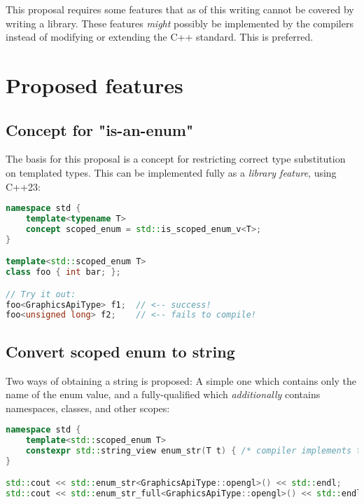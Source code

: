 \documentclass[
  format=manuscript,
  screen=true,
  review=false,
  nonacm=true,
  timestamp=true,
  balance=false]{acmart}
\begin{document}
This proposal requires some features that as of this writing cannot be covered by
writing a library. These features \textit{might} possibly be implemented by the
compilers instead of modifying or extending the C++ standard. This is preferred.


\section{Proposed features}

\subsection{Concept for "is-an-enum"}

The basis for this proposal is a concept for restricting correct type substitution
on templated types. This can be implemented fully as a \textit{library feature},
using C++23:\vspace{2mm}

\begin{lstlisting}[language=Cpp]
namespace std {
    template<typename T>
    concept scoped_enum = std::is_scoped_enum_v<T>;
}

template<std::scoped_enum T>
class foo { int bar; };

// Try it out:
foo<GraphicsApiType> f1;  // <-- success!
foo<unsigned long> f2;    // <-- fails to compile!
\end{lstlisting}


\subsection{Convert scoped enum to string}

Two ways of obtaining a string is proposed: A simple one which contains only the
name of the enum value, and a fully-qualified which \textit{additionally} contains
namespaces, classes, and other scopes:\vspace{2mm}

\begin{lstlisting}[language=Cpp]
namespace std {
    template<std::scoped_enum T>
    constexpr std::string_view enum_str(T t) { /* compiler implements this */ }
}

std::cout << std::enum_str<GraphicsApiType::opengl>() << std::endl;      // "opengl"
std::cout << std::enum_str_full<GraphicsApiType::opengl>() << std::endl; // "GraphicsApiType::opengl"
\end{lstlisting}
\end{document}
